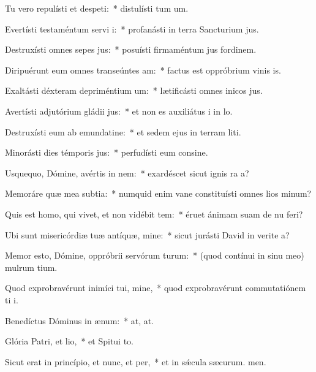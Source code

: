 \item Tu vero repulísti et despeti:~* distulísti tum um.
\item Evertísti testaméntum servi i:~* profanásti in terra Sancturium jus.
\item Destruxísti omnes sepes jus:~* posuísti firmaméntum jus fordinem.
\item Diripuérunt eum omnes transeúntes am:~* factus est oppróbrium vinis is.
\item Exaltásti déxteram depriméntium um:~* lætificásti omnes inicos jus.
\item Avertísti adjutórium gládii jus:~* et non es auxiliátus i in lo.
\item Destruxísti eum ab emundatine:~* et sedem ejus in terram liti.
\item Minorásti dies témporis jus:~* perfudísti eum consine.
\item Usquequo, Dómine, avértis in nem:~* exardéscet sicut ignis ra a?
\item Memoráre quæ mea subtia:~* numquid enim vane constituísti omnes lios minum?
\item Quis est homo, qui vivet, et non vidébit tem:~* éruet ánimam suam de nu feri?
\item Ubi sunt misericórdiæ tuæ antíquæ, mine:~* sicut jurásti David in verite a?
\item Memor esto, Dómine, oppróbrii servórum turum:~* (quod contínui in sinu meo) mulrum tium.
\item Quod exprobravérunt inimíci tui, mine,~* quod exprobravérunt commutatiónem ti i.
\item Benedíctus Dóminus in ænum:~* at, at.
\item Glória Patri, et lio,~* et Spitui to.
\item Sicut erat in princípio, et nunc, et per,~* et in sǽcula sæcurum. men.
